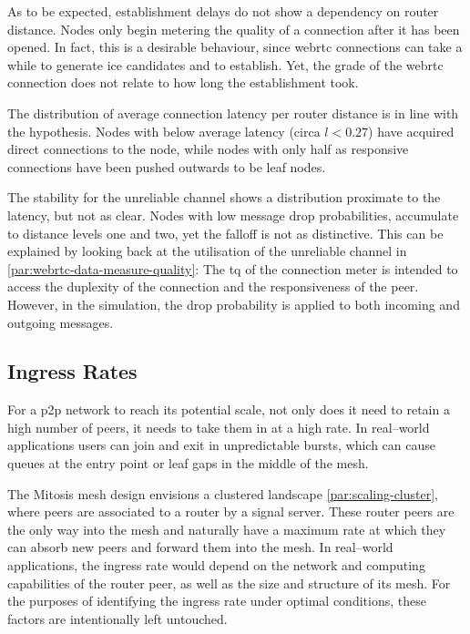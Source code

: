 As to be expected, establishment delays do not show a dependency on router distance. Nodes only begin metering the quality of a connection after it has been opened. In fact, this is a desirable behaviour, since \gls{webrtc} connections can take a while to generate \gls{ice} candidates and to establish. Yet, the grade of the \gls{webrtc} connection does not relate to how long the establishment took.

The distribution of average connection latency per router distance is in line with the hypothesis. Nodes with below average latency (circa $l<0.27$) have acquired direct connections to the \router node, while nodes with only half as responsive connections have been pushed outwards to be leaf nodes.

The stability for the unreliable channel shows a distribution proximate to the latency, but not as clear. Nodes with low message drop probabilities, accumulate to distance levels one and two, yet the falloff is not as distinctive. This can be explained by looking back at the utilisation of the unreliable channel in \vref{par:webrtc-data-measure-quality}: The \gls{tq} of the connection meter is intended to access the duplexity of the connection and the responsiveness of the peer. However, in the simulation, the drop probability is applied to both incoming and outgoing messages.

\subsection{Ingress Rates}

For a \gls{p2p} network to reach its potential scale, not only does it need to retain a high number of peers, it needs to take them in at a high rate. In real–world applications users can join and exit in unpredictable bursts, which can cause queues at the entry point or leaf gaps in the middle of the mesh.

The Mitosis mesh design envisions a clustered landscape \cref{par:scaling-cluster}, where peers are associated to a router by a signal server. These router peers are the only way into the mesh and naturally have a maximum rate at which they can absorb new peers and forward them into the mesh. In real–world applications, the ingress rate would depend on the network and computing capabilities of the router peer, as well as the size and structure of its mesh. For the purposes of identifying the ingress rate under optimal conditions, these factors are intentionally left untouched.

